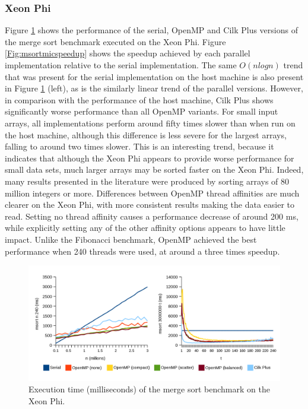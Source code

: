 \documentclass{report}
\begin{document}
\subsubsection{Xeon Phi}

Figure \ref{Fig:msortmictime} shows the performance of the serial, OpenMP and Cilk Plus versions of the merge sort benchmark executed on the Xeon Phi. Figure \ref{Fig:msortmicspeedup} shows the speedup achieved by each parallel implementation relative to the serial implementation. The same \(O(nlogn)\) trend that was present for the serial implementation on the host machine is also present in Figure \ref{Fig:msortmictime} (left), as is the similarly linear trend of the parallel versions. However, in comparison with the performance of the host machine, Cilk Plus shows significantly worse performance than all OpenMP variants. For small input arrays, all implementations perform around fifty times slower than when run on the host machine, although this difference is less severe for  the largest arrays, falling to around two times slower. This is an interesting trend, because it indicates that although the Xeon Phi appears to provide worse performance for small data sets, much larger arrays may be sorted faster on the Xeon Phi. Indeed, many results presented in the literature were produced by sorting arrays of 80 million integers or more\cite{Tousimojarad14}. Differences between OpenMP thread affinities are much clearer on the Xeon Phi, with more consistent results making the data easier to read. Setting no thread affinity causes a performance decrease of around 200 ms, while explicitly setting any of the other affinity options appears to have little impact. Unlike the Fibonacci benchmark, OpenMP achieved the best performance when 240 threads were used, at around a three times speedup.
\noindent
\begin{figure}[t!]
	\includegraphics[width=\linewidth]{../../charts/mic/msort_time}
	\caption{Execution time (milliseconds) of the merge sort benchmark on the Xeon Phi.}
	\label{Fig:msortmictime}
\end{figure}
\end{document}
